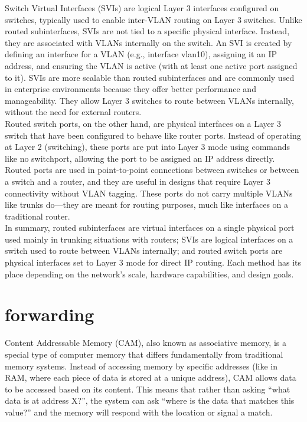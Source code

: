 \documentclass{article}
\begin{document}
Switch Virtual Interfaces (SVIs) are logical Layer 3 interfaces configured on switches, typically used to enable inter-VLAN routing on Layer 3 switches. Unlike routed subinterfaces, SVIs are not tied to a specific physical interface. Instead, they are associated with VLANs internally on the switch. An SVI is created by defining an interface for a VLAN (e.g., interface vlan10), assigning it an IP address, and ensuring the VLAN is active (with at least one active port assigned to it). SVIs are more scalable than routed subinterfaces and are commonly used in enterprise environments because they offer better performance and manageability. They allow Layer 3 switches to route between VLANs internally, without the need for external routers.\\

Routed switch ports, on the other hand, are physical interfaces on a Layer 3 switch that have been configured to behave like router ports. Instead of operating at Layer 2 (switching), these ports are put into Layer 3 mode using commands like no switchport, allowing the port to be assigned an IP address directly. Routed ports are used in point-to-point connections between switches or between a switch and a router, and they are useful in designs that require Layer 3 connectivity without VLAN tagging. These ports do not carry multiple VLANs like trunks do—they are meant for routing purposes, much like interfaces on a traditional router.\\

In summary, routed subinterfaces are virtual interfaces on a single physical port used mainly in trunking situations with routers; SVIs are logical interfaces on a switch used to route between VLANs internally; and routed switch ports are physical interfaces set to Layer 3 mode for direct IP routing. Each method has its place depending on the network’s scale, hardware capabilities, and design goals.\\

\section*{forwarding}

Content Addressable Memory (CAM), also known as associative memory, is a special type of computer memory that differs fundamentally from traditional memory systems. Instead of accessing memory by specific addresses (like in RAM, where each piece of data is stored at a unique address), CAM allows data to be accessed based on its content. This means that rather than asking “what data is at address X?”, the system can ask “where is the data that matches this value?” and the memory will respond with the location or signal a match.\\
\end{document}
